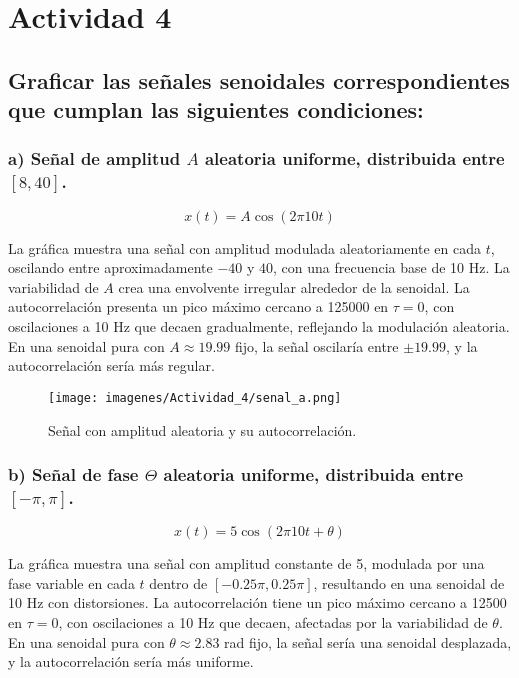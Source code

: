 \section{Actividad 4}

\subsection*{Graficar las señales senoidales correspondientes que cumplan las siguientes condiciones:}

\subsubsection*{a) Señal de amplitud \(A\) aleatoria uniforme, distribuida entre \([8, 40]\).}

\[
x(t) = A \cos(2 \pi 10 t)
\]

La gráfica muestra una señal con amplitud modulada aleatoriamente en cada $t$, oscilando entre aproximadamente $-40$ y $40$, con una frecuencia base de 10 Hz. La variabilidad de $A$ crea una envolvente irregular alrededor de la senoidal. La autocorrelación presenta un pico máximo cercano a 125000 en $\tau=0$, con oscilaciones a 10 Hz que decaen gradualmente, reflejando la modulación aleatoria. En una senoidal pura con $A \approx 19.99$ fijo, la señal oscilaría entre $\pm 19.99$, y la autocorrelación sería más regular.

\begin{figure}[H]
\centering
\texttt{[image: imagenes/Actividad\_4/senal\_a.png]}
\caption{Señal con amplitud aleatoria y su autocorrelación.}
\label{fig:a}
\end{figure}

\subsubsection*{b) Señal de fase \(\Theta\) aleatoria uniforme, distribuida entre \([-\pi, \pi]\).}

\[
x(t) = 5 \cos(2 \pi 10 t + \theta)
\]

La gráfica muestra una señal con amplitud constante de 5, modulada por una fase variable en cada $t$ dentro de $[-0.25\pi, 0.25\pi]$, resultando en una senoidal de 10 Hz con distorsiones. La autocorrelación tiene un pico máximo cercano a 12500 en $\tau=0$, con oscilaciones a 10 Hz que decaen, afectadas por la variabilidad de $\theta$. En una senoidal pura con $\theta \approx 2.83$ rad fijo, la señal sería una senoidal desplazada, y la autocorrelación sería más uniforme.

